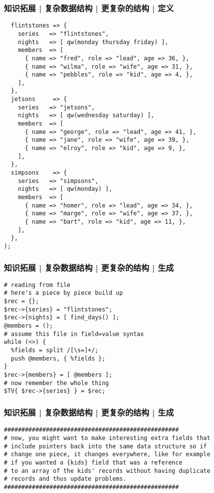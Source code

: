 \begin{frame}[fragile]
  \frametitle{知识拓展 | 复杂数据结构 | 更复杂的结构 | 定义}
  \vspace{-0.8em}
\begin{lstlisting}[basicstyle=\scriptsize\tt,numberstyle=\tiny]
%TV = (
  flintstones => {
    series   => "flintstones",
    nights   => [ qw(monday thursday friday) ],
    members  => [
      { name => "fred", role => "lead", age => 36, },
      { name => "wilma", role => "wife", age => 31, },
      { name => "pebbles", role => "kid", age => 4, },
    ],
  },
  jetsons     => {
    series   => "jetsons",
    nights   => [ qw(wednesday saturday) ],
    members  => [
      { name => "george", role => "lead", age => 41, },
      { name => "jane", role => "wife", age => 39, },
      { name => "elroy", role => "kid", age => 9, },
    ],
  },
  simpsons    => {
    series   => "simpsons",
    nights   => [ qw(monday) ],
    members  => [
      { name => "homer", role => "lead", age => 34, },
      { name => "marge", role => "wife", age => 37, },
      { name => "bart", role => "kid", age => 11, },
    ],
  },
);
\end{lstlisting}
\end{frame}

\begin{frame}[fragile]
  \frametitle{知识拓展 | 复杂数据结构 | 更复杂的结构 | 生成}
\begin{lstlisting}
# reading from file
# here's a piece by piece build up
$rec = {};
$rec->{series} = "flintstones";
$rec->{nights} = [ find_days() ];
@members = ();
# assume this file in field=value syntax
while (<>) {
  %fields = split /[\s=]+/;
  push @members, { %fields };
}
$rec->{members} = [ @members ];
# now remember the whole thing
$TV{ $rec->{series} } = $rec;
\end{lstlisting}
\end{frame}

\begin{frame}[fragile]
  \frametitle{知识拓展 | 复杂数据结构 | 更复杂的结构 | 生成}
\begin{lstlisting}[basicstyle=\small\tt]
##################################################
# now, you might want to make interesting extra fields that
# include pointers back into the same data structure so if
# change one piece, it changes everywhere, like for example
# if you wanted a {kids} field that was a reference
# to an array of the kids' records without having duplicate
# records and thus update problems.
##################################################
\end{lstlisting}
\end{frame}

